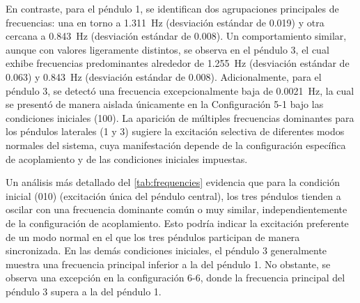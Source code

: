 En contraste, para el p\'endulo 1, se identifican dos agrupaciones
principales de frecuencias: una en torno a \qty{1.311}{\Hz}
(desviaci\'on est\'andar de \num{0.019}) y otra cercana a
\qty{0.843}{\Hz} (desviaci\'on est\'andar de \num{0.008}). Un
comportamiento similar, aunque con valores ligeramente distintos, se
observa en el p\'endulo 3, el cual exhibe frecuencias predominantes
alrededor de \qty{1.255}{\Hz} (desviaci\'on est\'andar de \num{0.063})
y \qty{0.843}{\Hz} (desviaci\'on est\'andar de \num{0.008}).
Adicionalmente, para el p\'endulo 3, se detect\'o una frecuencia
excepcionalmente baja de \qty{0.0021}{\Hz}, la cual se present\'o
de manera aislada \'unicamente en la Configuraci\'on 5-1 bajo las
condiciones iniciales (100). La aparici\'on de m\'ultiples
frecuencias dominantes para los p\'endulos laterales (1 y 3)
sugiere la excitaci\'on selectiva de diferentes modos normales del
sistema, cuya manifestaci\'on depende de la configuraci\'on
espec\'ifica de acoplamiento y de las condiciones iniciales
impuestas.

Un an\'alisis m\'as detallado del \cref{tab:frequencies} evidencia
que para la condici\'on inicial (010) (excitaci\'on \'unica del
p\'endulo central), los tres p\'endulos tienden a oscilar con una
frecuencia dominante com\'un o muy similar, independientemente de la
configuraci\'on de acoplamiento. Esto podr\'ia indicar la
excitaci\'on preferente de un modo normal en el que los tres
p\'endulos participan de manera sincronizada. En las dem\'as
condiciones iniciales, el p\'endulo 3 generalmente muestra una
frecuencia principal inferior a la del p\'endulo 1. No obstante,
se observa una excepci\'on en la configuraci\'on 6-6, donde la
frecuencia principal del p\'endulo 3 supera a la del p\'endulo 1.

